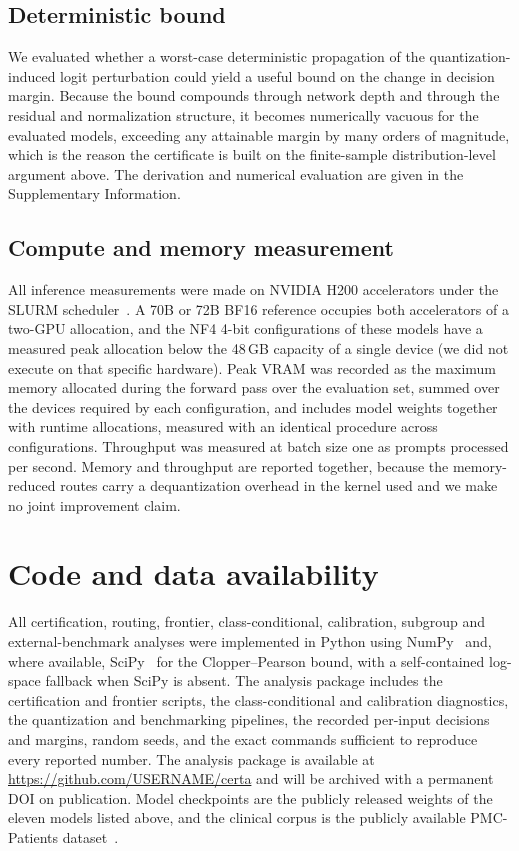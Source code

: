 \documentclass[pdflatex,sn-mathphys-num]{sn-jnl}%
\theoremstyle{thmstyleone}%
\theoremstyle{thmstyletwo}%
\theoremstyle{thmstylethree}%
\begin{document}
\subsection*{Deterministic bound}
 
We evaluated whether a worst-case deterministic propagation of the quantization-induced logit
perturbation could yield a useful bound on the change in decision margin. Because the bound compounds
through network depth and through the residual and normalization structure, it becomes numerically
vacuous for the evaluated models, exceeding any attainable margin by many orders of magnitude, which
is the reason the certificate is built on the finite-sample distribution-level argument above. The
derivation and numerical evaluation are given in the Supplementary Information.
 
\subsection*{Compute and memory measurement}
 
All inference measurements were made on NVIDIA H200 accelerators under the SLURM scheduler~\cite{yoo2003slurm}. A 70B or
72B BF16 reference occupies both accelerators of a two-GPU allocation, and the NF4 4-bit
configurations of these models have a measured peak allocation below the 48\,GB capacity of a single device (we did not execute on that specific hardware). Peak VRAM was recorded as the
maximum memory allocated during the forward pass over the evaluation set, summed over the devices
required by each configuration, and includes model weights together with runtime allocations,
measured with an identical procedure across configurations. Throughput was measured at batch size
one as prompts processed per second. Memory and throughput are reported together, because the
memory-reduced routes carry a dequantization overhead in the kernel used and we make no joint
improvement claim.
 
\section*{Code and data availability}
 
All certification, routing, frontier, class-conditional, calibration, subgroup and external-benchmark
analyses were implemented in Python using NumPy~\cite{harris2020numpy} and, where available, SciPy~\cite{virtanen2020scipy} for the Clopper--Pearson
bound, with a self-contained log-space fallback when SciPy is absent. The analysis package includes
the certification and frontier scripts, the class-conditional and calibration diagnostics, the
quantization and benchmarking pipelines, the recorded per-input decisions and margins, random seeds,
and the exact commands sufficient to reproduce every reported number. The analysis package is
available at \url{https://github.com/USERNAME/certa} and will be archived with a permanent DOI
on publication. Model checkpoints are the
publicly released weights of the eleven models listed above, and the clinical corpus is the publicly
available PMC-Patients dataset~\cite{zhao2023large}.
\end{document}
